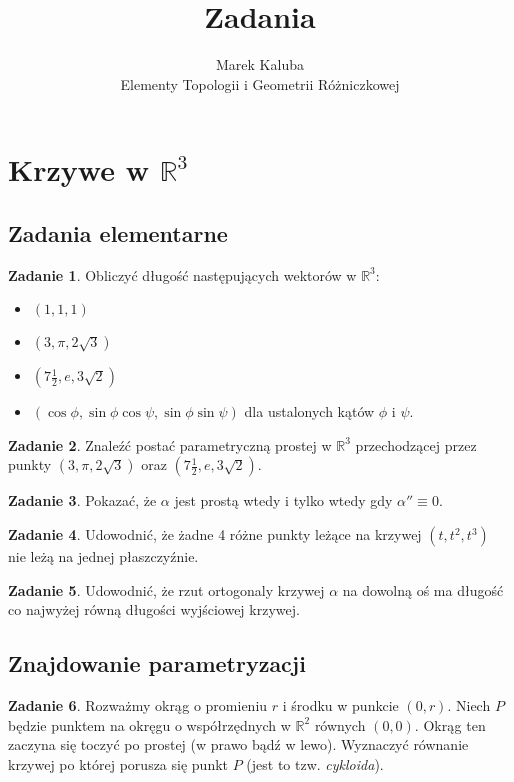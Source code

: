 \documentclass[a4paper,11pt]{article}
\title{Zadania}
\author{Marek Kaluba\\Elementy Topologii i Geometrii Różniczkowej}
\theoremstyle{definition}\newtheorem{exercise}{Zadanie}
\theoremstyle{definition}\newtheorem{remark}{Uwaga}
\begin{document}
\section{Krzywe w $\mathbb{R}^3$}

\subsection{Zadania elementarne}

\begin{exercise}
 Obliczyć długość następujących wektor\'ow w $\mathbb{R}^3$:
\begin{itemize}
 \item $(1,1,1)$
 \item $(3,\pi,2\sqrt{3})$
 \item $(7\frac{1}{2},e,3\sqrt{2})$
 \item $(\cos \phi, \sin \phi \cos \psi, \sin\phi\sin\psi)$ dla ustalonych 
kąt\'ow $\phi$ i $\psi$.
 
\end{itemize}
\end{exercise}

\begin{exercise}
Znaleźć postać parametryczną prostej  w $\mathbb{R}^3$ przechodzącej
przez punkty $(3,\pi,2\sqrt{3})$ oraz $(7\frac{1}{2},e,3\sqrt{2})$.
\end{exercise}

\begin{exercise}
Pokazać, że $\alpha$ jest prostą wtedy i tylko wtedy gdy $\alpha''\equiv 0$.
\end{exercise}

\begin{exercise}
Udowodnić, że żadne 4 różne punkty leżące na krzywej $(t,t^2,t^3)$ nie leżą 
na jednej płaszczyźnie.
\end{exercise}

\begin{exercise}
Udowodnić, że rzut ortogonaly krzywej $\alpha$ na dowolną oś ma długość co 
najwyżej równą długości wyjściowej krzywej.
\end{exercise}

\subsection{Znajdowanie parametryzacji}

\begin{exercise}
Rozważmy okrąg o promieniu $r$ i środku w punkcie $(0,r)$. Niech $P$ będzie 
punktem na okręgu o wsp\'ołrzędnych w $\mathbb{R}^2$ r\'ownych $(0,0)$. Okrąg 
ten zaczyna się toczyć po prostej (w prawo bądź w lewo). Wyznaczyć r\'ownanie 
krzywej po kt\'orej porusza się punkt $P$ (jest to tzw. \textit{cykloida}).
\end{exercise}
\end{document}
